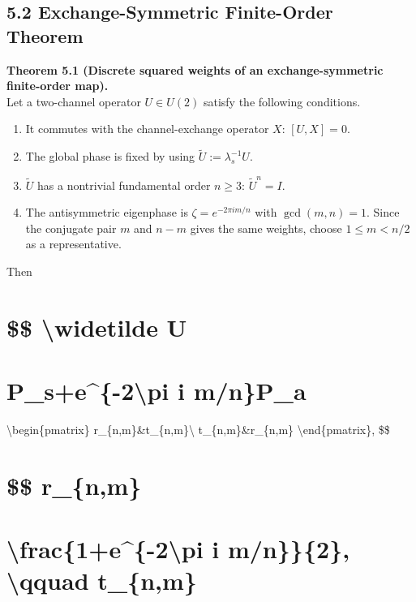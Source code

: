 \documentclass[
  a4paper,
  10pt]{article}
\providecommand{\tightlist}{%
  \setlength{\itemsep}{0pt}\setlength{\parskip}{0pt}}
\begin{document}
\subsection{5.2 Exchange-Symmetric Finite-Order
Theorem}\label{52-exchange-symmetric-finite-order-theorem}

\textbf{Theorem 5.1 (Discrete squared weights of an exchange-symmetric
finite-order map).}\\
Let a two-channel operator \(U\in U(2)\) satisfy the following
conditions.

\begin{enumerate}
\def\labelenumi{\arabic{enumi}.}
\tightlist
\item
  It commutes with the channel-exchange operator \(X\): \([U,X]=0\).
\item
  The global phase is fixed by using \(\widetilde U:=\lambda_s^{-1}U\).
\item
  \(\widetilde U\) has a nontrivial fundamental order \(n\ge3\):
  \(\widetilde U^n=I\).
\item
  The antisymmetric eigenphase is \(\zeta=e^{-2\pi i m/n}\) with
  \(\gcd(m,n)=1\). Since the conjugate pair \(m\) and \(n-m\) gives the
  same weights, choose \(1\le m<n/2\) as a representative.
\end{enumerate}

Then

\section{\$\$ \textbackslash widetilde U}\label{-widetilde-u}

\section{P\_s+e\^{}\{-2\textbackslash pi i
m/n\}P\_a}\label{p_se-2pi-i-mnp_a}

\textbackslash begin\{pmatrix\} r\_\{n,m\}\&t\_\{n,m\}\textbackslash{}
t\_\{n,m\}\&r\_\{n,m\} \textbackslash end\{pmatrix\}, \$\$

\section{\$\$ r\_\{n,m\}}\label{-r_nm}

\section{\textbackslash frac\{1+e\^{}\{-2\textbackslash pi i
m/n\}\}\{2\}, \textbackslash qquad
t\_\{n,m\}}\label{frac1e-2pi-i-mn2-qquad-t_nm}
\end{document}
